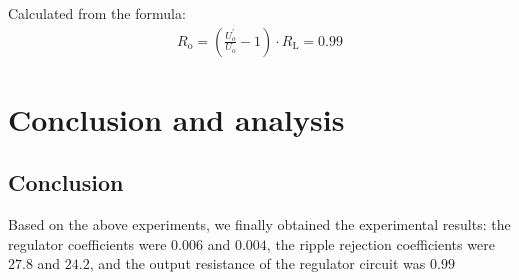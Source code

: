 \documentclass[UTF8]{article}
\begin{document}
   Calculated from the formula:
    \begin{eqnarray}
      R_{\mathrm{o}}=\left(\frac{U_{o}^{\prime}}{U_{o}}-1\right) \cdot R_{\mathrm{L}} = 0.99
      \end{eqnarray}


\section{Conclusion and analysis}
\subsection{Conclusion}
Based on the above experiments, we finally obtained the experimental results: the regulator coefficients were $0.006$ and $0.004$, the ripple rejection coefficients were $27.8$ and $24.2$, and the output resistance of the regulator circuit was $0.99$
\end{document}
